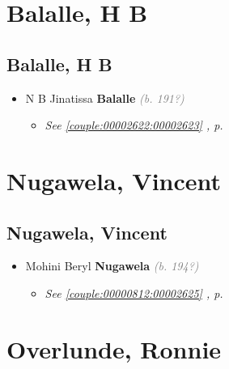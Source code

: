 \documentclass[10pt, openany]{book}
\begin{document}
\part{Balalle, H B}
\chapter{Balalle, H B}
\label{00002624}
\textcolor{slmaroon}{\textit{}}
\begin{itemize}
\item{N B Jinatissa \textbf{Balalle} \textcolor{gray}{\textit{(b. 191?)}}
\begin{itemize}
\item{\textcolor{slteal}{\textit{See  \autoref{couple:00002622:00002623} \textit{, p. \pageref{couple:00002622:00002623} }}}}
\end{itemize}
   }
\end{itemize}
  
\part{Nugawela, Vincent}
\chapter{Nugawela, Vincent}
\label{00002626}
\textcolor{slmaroon}{\textit{}}
\begin{itemize}
\item{Mohini Beryl \textbf{Nugawela} \textcolor{gray}{\textit{(b. 194?)}}
\begin{itemize}
\item{\textcolor{slteal}{\textit{See  \autoref{couple:00000812:00002625} \textit{, p. \pageref{couple:00000812:00002625} }}}}
\end{itemize}
  }
\end{itemize}
 
\part{Overlunde, Ronnie}
\end{document}
